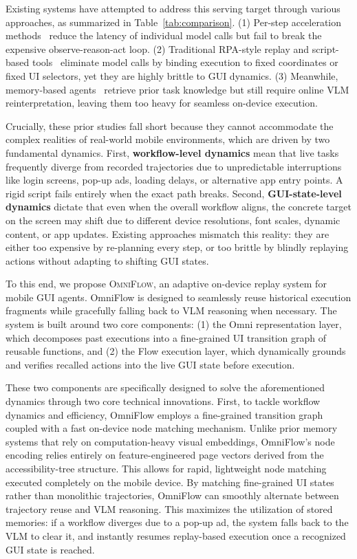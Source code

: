 Existing systems have attempted to address this serving target through various approaches, as summarized in Table~\ref{tab:comparison}. 
(1) Per-step acceleration methods~\cite{chen2025less,dai2025advancing,lin2025showui,gomez2013reran} reduce the latency of individual model calls but fail to break the expensive observe-reason-act loop.
(2) Traditional RPA-style replay and script-based tools~\cite{li2017sugilite,gomez2013reran,maestro2026,openatx_uiautomator2_2026} eliminate model calls by binding execution to fixed coordinates or fixed UI selectors, yet they are highly brittle to GUI dynamics.
(3) Meanwhile, memory-based agents~\cite{wen2024autodroid,zhang2025appagent,lee2024mobilegpt} retrieve prior task knowledge but still require online VLM reinterpretation, leaving them too heavy for seamless on-device execution.

Crucially, these prior studies fall short because they cannot accommodate the complex realities of real-world mobile environments, which are driven by two fundamental dynamics.
First, \textbf{workflow-level dynamics} mean that live tasks frequently diverge from recorded trajectories due to unpredictable interruptions like login screens, pop-up ads, loading delays, or alternative app entry points.
A rigid script fails entirely when the exact path breaks.
Second, \textbf{GUI-state-level dynamics} dictate that even when the overall workflow aligns, the concrete target on the screen may shift due to different device resolutions, font scales, dynamic content, or app updates.
Existing approaches mismatch this reality: they are either too expensive by re-planning every step, or too brittle by blindly replaying actions without adapting to shifting GUI states.

To this end, we propose \textsc{OmniFlow}, an adaptive on-device replay system for mobile GUI agents.
OmniFlow is designed to seamlessly reuse historical execution fragments while gracefully falling back to VLM reasoning when necessary.
The system is built around two core components:
(1) the Omni representation layer, which decomposes past executions into a fine-grained UI transition graph of reusable functions, and
(2) the Flow execution layer, which dynamically grounds and verifies recalled actions into the live GUI state before execution.


These two components are specifically designed to solve the aforementioned dynamics through two core technical innovations.
First, to tackle workflow dynamics and efficiency, OmniFlow employs a fine-grained transition graph coupled with a fast on-device node matching mechanism.
Unlike prior memory systems that rely on computation-heavy visual embeddings, OmniFlow's node encoding relies entirely on feature-engineered page vectors derived from the accessibility-tree structure.
This allows for rapid, lightweight node matching executed completely on the mobile device.
By matching fine-grained UI states rather than monolithic trajectories, OmniFlow can smoothly alternate between trajectory reuse and VLM reasoning.
This maximizes the utilization of stored memories: if a workflow diverges due to a pop-up ad, the system falls back to the VLM to clear it, and instantly resumes replay-based execution once a recognized GUI state is reached.

